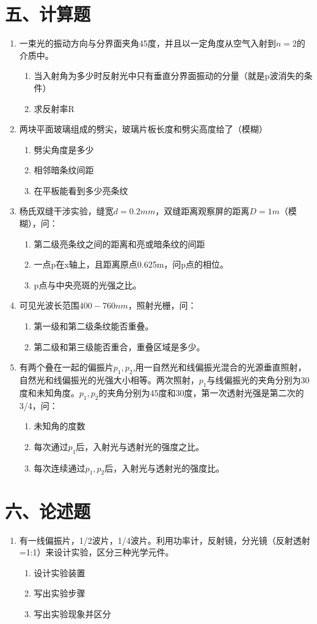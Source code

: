 \documentclass[12pt, a4paper]{article}
\theoremstyle{solution}
\begin{document}
\section*{五、计算题}
\begin{enumerate}
    \item 一束光的振动方向与分界面夹角45度，并且以一定角度从空气入射到$n=2$的介质中。
        \begin{enumerate}
            \item 当入射角为多少时反射光中只有垂直分界面振动的分量（就是p波消失的条件）
            \item 求反射率R
        \end{enumerate}
    \item 两块平面玻璃组成的劈尖，玻璃片板长度和劈尖高度给了（模糊）
        \begin{enumerate}
            \item 劈尖角度是多少
            \item 相邻暗条纹间距
            \item 在平板能看到多少亮条纹
        \end{enumerate}
    \item 杨氏双缝干涉实验，缝宽$d=0.2mm$，双缝距离观察屏的距离$D=1m$（模糊），问：
        \begin{enumerate}
            \item 第二级亮条纹之间的距离和亮或暗条纹的间距
            \item 一点p在x轴上，且距离原点0.625m，问p点的相位。
            \item p点与中央亮斑的光强之比。
        \end{enumerate}
    \item 可见光波长范围$400-760nm$，照射光栅，问：
        \begin{enumerate}
            \item 第一级和第二级条纹能否重叠。
            \item 第二级和第三级能否重合，重叠区域是多少。
        \end{enumerate}
    \item 有两个叠在一起的偏振片$p_1,p_2$,用一自然光和线偏振光混合的光源垂直照射，自然光和线偏振光的光强大小相等。两次照射，$p_1$与线偏振光的夹角分别为30度和未知角度。$p_1,p_2$的夹角分别为45度和30度，第一次透射光强是第二次的3/4，问：
        \begin{enumerate}
            \item 未知角的度数
            \item 每次通过$p_1$后，入射光与透射光的强度之比。
            \item 每次连续通过$p_1,p_2$后，入射光与透射光的强度比。
        \end{enumerate}
\end{enumerate}
\section*{六、论述题}
\begin{enumerate}
    \item   有一线偏振片，1/2波片，1/4波片。利用功率计，反射镜，分光镜（反射透射=1:1）来设计实验，区分三种光学元件。
        \begin{enumerate}
            \item 设计实验装置
            \item 写出实验步骤
            \item 写出实验现象并区分
        \end{enumerate}
    \end{enumerate}  
\end{document}
